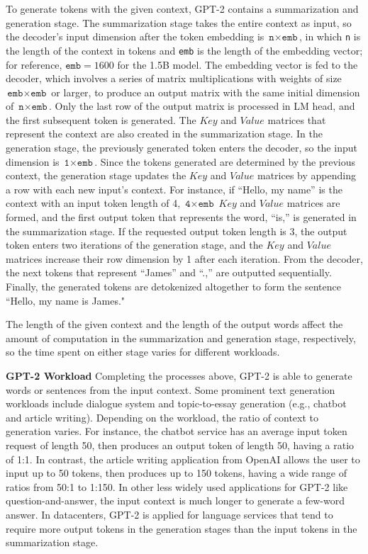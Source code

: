 To generate tokens with the given context, GPT-2 contains a summarization and generation stage. The summarization stage takes the entire context as input, so the decoder's input dimension after the token embedding is $\texttt{n}\times\texttt{emb}$, in which \texttt{n} is the length of the context in tokens and \texttt{emb} is the length of the embedding vector; for reference, $\texttt{emb} = 1600$ for the 1.5B model. The embedding vector is fed to the decoder, which involves a series of matrix multiplications with weights of size $\texttt{emb}\times\texttt{emb}$ or larger, to produce an output matrix with the same initial dimension of $\texttt{n}\times\texttt{emb}$. Only the last row of the output matrix is processed in LM head, and the first subsequent token is generated. The $Key$ and $Value$ matrices that represent the context are also created in the summarization stage. In the generation stage, the previously generated token enters the decoder, so the input dimension is $\texttt{1}\times\texttt{emb}$. Since the tokens generated are determined by the previous context, the generation stage updates the $Key$ and $Value$ matrices by appending a row with each new input's context. For instance, if ``Hello, my name'' is the context with an input token length of 4,  $\texttt{4}\times\texttt{emb}$ $Key$ and $Value$ matrices are formed, and the first output token that represents the word, ``is,'' is generated in the summarization stage. If the requested output token length is 3, the output token enters two iterations of the generation stage, and the $Key$ and $Value$ matrices increase their row dimension by 1 after each iteration. From the decoder, the next tokens that represent ``James'' and ``.,'' are outputted sequentially. Finally, the generated tokens are detokenized altogether to form the sentence ``Hello, my name is James."

The length of the given context and the length of the output words affect the amount of computation in the summarization and generation stage, respectively, so the time spent on either stage varies for different workloads.

\textbf{GPT-2 Workload}
Completing the processes above, GPT-2 is able to generate words or sentences from the input context. 
Some prominent text generation workloads include dialogue system and topic-to-essay generation (e.g., chatbot and article writing). Depending on the workload, the ratio of context to generation varies. For instance, the chatbot service has an average input token request of length 50, then produces an output token of length 50, having a ratio of 1:1. In contrast, the article writing application from OpenAI allows the user to input up to 50 tokens, then produces up to 150 tokens, having a wide range of ratios from 50:1 to 1:150\cite{tokenratio}. In other less widely used applications for GPT-2 like question-and-answer, the input context is much longer to generate a few-word answer. In datacenters, GPT-2 is applied for language services that tend to require more output tokens in the generation stages than the input tokens in the summarization stage.



